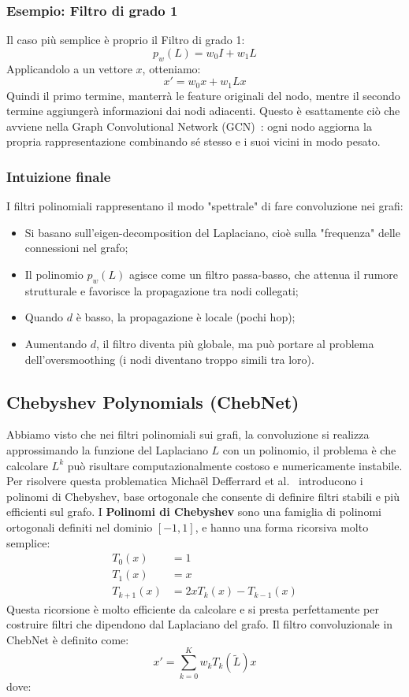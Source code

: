 \subsubsection{Esempio: Filtro di grado 1}
Il caso più semplice è proprio il Filtro di grado 1:
\[
  p_w(L) = w_0 I + w_1 L
\]
Applicandolo a un vettore \( x \), otteniamo:
\[
  x' = w_0 x + w_1 Lx
\]
Quindi il primo termine, manterrà le feature originali del nodo, mentre il secondo termine aggiungerà informazioni dai nodi adiacenti. Questo è esattamente ciò che avviene nella Graph Convolutional Network (GCN)~\cite{kipf2017semi}: ogni nodo aggiorna la propria rappresentazione combinando sé stesso e i suoi vicini in modo pesato.

\subsubsection{Intuizione finale}
I filtri polinomiali rappresentano il modo "spettrale" di fare convoluzione nei grafi:

\begin{itemize}
    \item Si basano sull’eigen-decomposition del Laplaciano, cioè sulla "frequenza" delle connessioni nel grafo;
    \item Il polinomio $p_w(L)$ agisce come un filtro passa-basso, che attenua il rumore strutturale e favorisce la propagazione tra nodi collegati;
    \item Quando $d$ è basso, la propagazione è locale (pochi hop);
    \item Aumentando $d$, il filtro diventa più globale, ma può portare al problema dell’oversmoothing (i nodi diventano troppo simili tra loro).
\end{itemize}

\subsection{Chebyshev Polynomials (ChebNet)}
Abbiamo visto che nei filtri polinomiali sui grafi, la convoluzione si realizza approssimando la funzione del Laplaciano $L$ con un polinomio, il problema è che calcolare $L^k$ può risultare computazionalmente costoso e numericamente instabile. Per risolvere questa problematica Michaël Defferrard et al.~\cite{defferrard2016convolutional} introducono i polinomi di Chebyshev, base ortogonale che consente di definire filtri stabili e più efficienti sul grafo. I \textbf{Polinomi di Chebyshev} sono una famiglia di polinomi ortogonali definiti nel dominio $[-1,1]$, e hanno una forma ricorsiva molto semplice:
\[
\begin{aligned}
  T_0(x) &= 1 \\
  T_1(x) &= x \\
  T_{k+1}(x) &= 2x T_k(x) - T_{k-1}(x)
\end{aligned}
\]
Questa ricorsione è molto efficiente da calcolare e si presta perfettamente per costruire filtri che dipendono dal Laplaciano del grafo. Il filtro convoluzionale in ChebNet è definito come:
\[
  x' = \sum_{k=0}^K w_k T_k(\tilde{L}) x
\]
dove:

